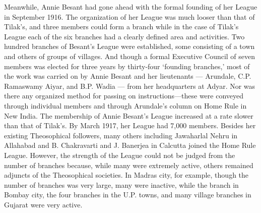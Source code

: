 Meanwhile, Annie Besant had gone ahead with the formal founding of her League in September 1916. The organization of her League was much looser than that of Tilak's, and three members could form a branch while in the case of Tilak's League each of the six branches had a clearly defined area and activities. Two hundred branches of Besant's League were established, some consisting of a town and others of groups of villages. And though a formal Executive Council of seven members was elected for three years by thirty-four `founding branches,' most of the work was carried on by Annie Besant and her lieutenants — Arundale, C.P. Ramaswamy Aiyar, and B.P. Wadia — from her headquarters at Adyar. Nor was there any organized method for passing on instructions—these were conveyed through individual members and through Arundale's column on Home Rule in New India. The membership of Annie Besant's League increased at a rate slower than that of Tilak's. By March 1917, her League had 7,000 members. Besides her existing Theosophical followers, many others including Jawaharlal Nehru in Allahabad and B. Chakravarti and J. Banerjea in Calcutta joined the Home Rule League. However, the strength of the League could not be judged from the number of branches because, while many were extremely active, others remained adjuncts of the Theosophical societies. In Madras city, for example, though the number of branches was very large, many were inactive, while the branch in Bombay city, the four branches in the U.P. towns, and many village branches in Gujarat were very active.

